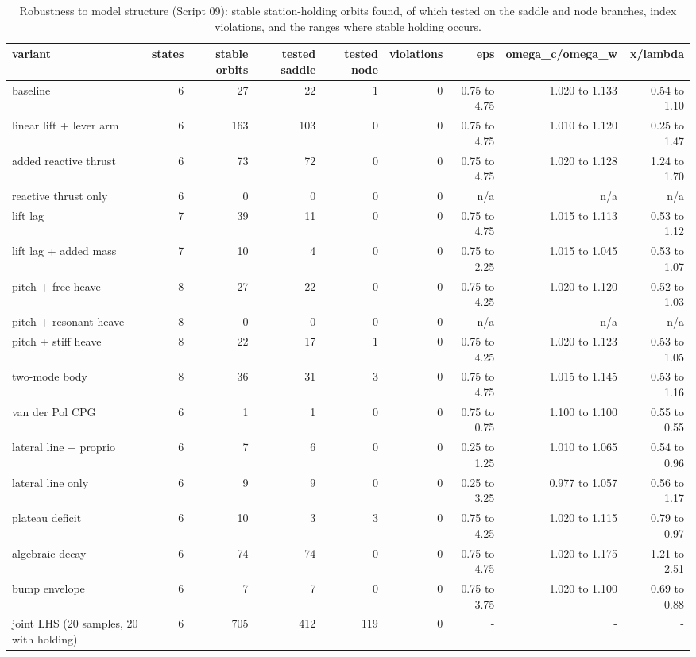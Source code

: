 \begin{table}
\caption{Robustness to model structure (Script 09): stable station-holding orbits found, of which tested on the saddle and node branches, index violations, and the ranges where stable holding occurs.}
\label{tab:T3_model_structures}
\begin{ruledtabular}
\begin{tabular}{lrrrrrrrr}
variant & states & stable orbits & tested saddle & tested node & violations & eps & omega\_c/omega\_w & x/lambda \\
\hline
baseline & 6 & 27 & 22 & 1 & 0 & 0.75 to 4.75 & 1.020 to 1.133 & 0.54 to 1.10 \\
linear lift + lever arm & 6 & 163 & 103 & 0 & 0 & 0.75 to 4.75 & 1.010 to 1.120 & 0.25 to 1.47 \\
added reactive thrust & 6 & 73 & 72 & 0 & 0 & 0.75 to 4.75 & 1.020 to 1.128 & 1.24 to 1.70 \\
reactive thrust only & 6 & 0 & 0 & 0 & 0 & n/a & n/a & n/a \\
lift lag & 7 & 39 & 11 & 0 & 0 & 0.75 to 4.75 & 1.015 to 1.113 & 0.53 to 1.12 \\
lift lag + added mass & 7 & 10 & 4 & 0 & 0 & 0.75 to 2.25 & 1.015 to 1.045 & 0.53 to 1.07 \\
pitch + free heave & 8 & 27 & 22 & 0 & 0 & 0.75 to 4.25 & 1.020 to 1.120 & 0.52 to 1.03 \\
pitch + resonant heave & 8 & 0 & 0 & 0 & 0 & n/a & n/a & n/a \\
pitch + stiff heave & 8 & 22 & 17 & 1 & 0 & 0.75 to 4.25 & 1.020 to 1.123 & 0.53 to 1.05 \\
two-mode body & 8 & 36 & 31 & 3 & 0 & 0.75 to 4.75 & 1.015 to 1.145 & 0.53 to 1.16 \\
van der Pol CPG & 6 & 1 & 1 & 0 & 0 & 0.75 to 0.75 & 1.100 to 1.100 & 0.55 to 0.55 \\
lateral line + proprio & 6 & 7 & 6 & 0 & 0 & 0.25 to 1.25 & 1.010 to 1.065 & 0.54 to 0.96 \\
lateral line only & 6 & 9 & 9 & 0 & 0 & 0.25 to 3.25 & 0.977 to 1.057 & 0.56 to 1.17 \\
plateau deficit & 6 & 10 & 3 & 3 & 0 & 0.75 to 4.25 & 1.020 to 1.115 & 0.79 to 0.97 \\
algebraic decay & 6 & 74 & 74 & 0 & 0 & 0.75 to 4.75 & 1.020 to 1.175 & 1.21 to 2.51 \\
bump envelope & 6 & 7 & 7 & 0 & 0 & 0.75 to 3.75 & 1.020 to 1.100 & 0.69 to 0.88 \\
joint LHS (20 samples, 20 with holding) & 6 & 705 & 412 & 119 & 0 & - & - & - \\
\end{tabular}
\end{ruledtabular}
\end{table}